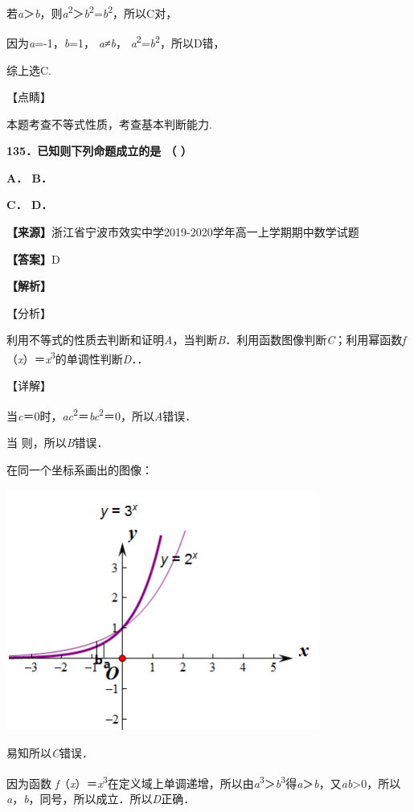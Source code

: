\documentclass[
]{article}
\begin{document}
若\emph{a}＞\textbar{}\emph{b}\textbar，则\emph{a}\textsuperscript{2}＞\textbar{}\emph{b}\textbar{}\textsuperscript{2}=\emph{b}\textsuperscript{2}，所以C对，

因为\emph{a}=-1，\emph{b}=1， \emph{a}≠\textbar{}\emph{b}\textbar，
\emph{a}\textsuperscript{2}=\emph{b}\textsuperscript{2}，所以D错，

综上选C.

【点睛】

本题考查不等式性质，考查基本判断能力.

\textbf{135．已知则下列命题成立的是 （ ）}

\textbf{A． B．}

\textbf{C． D．}

\textbf{【来源】}浙江省宁波市效实中学2019-2020学年高一上学期期中数学试题

\textbf{【答案】}D

\textbf{【解析】}

【分析】

利用不等式的性质去判断和证明\emph{A}，当判断\emph{B}．利用函数图像判断\emph{C}；利用幂函数\emph{f}（\emph{x}）＝\emph{x}\textsuperscript{3}的单调性判断\emph{D}．．

【详解】

当\emph{c}＝0时，\emph{ac}\textsuperscript{2}＝\emph{bc}\textsuperscript{2}＝0，所以\emph{A}错误．

当 则，所以\emph{B}错误．

在同一个坐标系画出的图像：

\includegraphics[width=4.04167in,height=3.125in]{Fig//media/image1437.png}

易知所以\emph{C}错误．

因为函数
\emph{f}（\emph{x}）＝\emph{x}\textsuperscript{3}在定义域上单调递增，所以由\emph{a}\textsuperscript{3}＞\emph{b}\textsuperscript{3}得\emph{a}＞\emph{b}，又\emph{ab}\textgreater0，所以\emph{a}，\emph{b}，同号，所以成立．所以\emph{D}正确．
\end{document}
